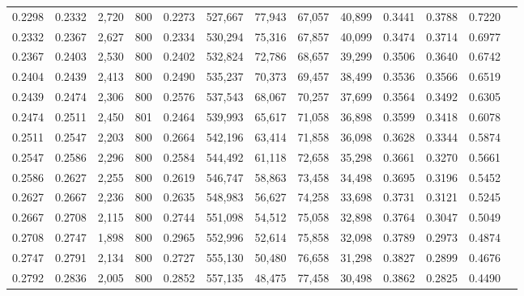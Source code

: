 \begin{tabular}{rrrrrrrrrrrrr}
0.2298 & 0.2332 &  2,720 &   800 &                                     0.2273 & 527,667 &  77,943 &  67,057 &  40,899 & 0.3441 & 0.3788 & 0.7220 \\
0.2332 & 0.2367 &  2,627 &   800 &                                     0.2334 & 530,294 &  75,316 &  67,857 &  40,099 & 0.3474 & 0.3714 & 0.6977 \\
0.2367 & 0.2403 &  2,530 &   800 &                                     0.2402 & 532,824 &  72,786 &  68,657 &  39,299 & 0.3506 & 0.3640 & 0.6742 \\
0.2404 & 0.2439 &  2,413 &   800 &                                     0.2490 & 535,237 &  70,373 &  69,457 &  38,499 & 0.3536 & 0.3566 & 0.6519 \\
0.2439 & 0.2474 &  2,306 &   800 &                                     0.2576 & 537,543 &  68,067 &  70,257 &  37,699 & 0.3564 & 0.3492 & 0.6305 \\
0.2474 & 0.2511 &  2,450 &   801 &                                     0.2464 & 539,993 &  65,617 &  71,058 &  36,898 & 0.3599 & 0.3418 & 0.6078 \\
0.2511 & 0.2547 &  2,203 &   800 &                                     0.2664 & 542,196 &  63,414 &  71,858 &  36,098 & 0.3628 & 0.3344 & 0.5874 \\
0.2547 & 0.2586 &  2,296 &   800 &                                     0.2584 & 544,492 &  61,118 &  72,658 &  35,298 & 0.3661 & 0.3270 & 0.5661 \\
0.2586 & 0.2627 &  2,255 &   800 &                                     0.2619 & 546,747 &  58,863 &  73,458 &  34,498 & 0.3695 & 0.3196 & 0.5452 \\
0.2627 & 0.2667 &  2,236 &   800 &                                     0.2635 & 548,983 &  56,627 &  74,258 &  33,698 & 0.3731 & 0.3121 & 0.5245 \\
0.2667 & 0.2708 &  2,115 &   800 &                                     0.2744 & 551,098 &  54,512 &  75,058 &  32,898 & 0.3764 & 0.3047 & 0.5049 \\
0.2708 & 0.2747 &  1,898 &   800 &                                     0.2965 & 552,996 &  52,614 &  75,858 &  32,098 & 0.3789 & 0.2973 & 0.4874 \\
0.2747 & 0.2791 &  2,134 &   800 &                                     0.2727 & 555,130 &  50,480 &  76,658 &  31,298 & 0.3827 & 0.2899 & 0.4676 \\
0.2792 & 0.2836 &  2,005 &   800 &                                     0.2852 & 557,135 &  48,475 &  77,458 &  30,498 & 0.3862 & 0.2825 & 0.4490 \\

\end{tabular}
